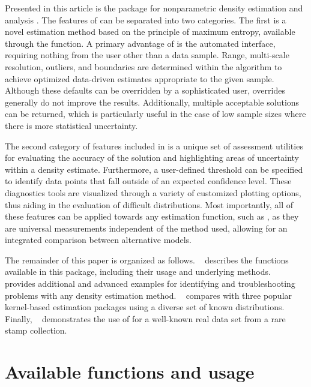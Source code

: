Presented in this article is the package  for nonparametric density estimation and analysis \citep{PDFe1}. The features of  can be separated into two categories. The first is a novel estimation method based on the principle of maximum entropy, available through the  function. A primary advantage of  is the automated interface, requiring nothing from the user other than a data sample. Range, multi-scale resolution, outliers, and boundaries are determined within the algorithm to achieve optimized data-driven estimates appropriate to the given sample. Although these defaults can be overridden by a sophisticated user, overrides generally do not improve the results. Additionally, multiple acceptable solutions can be returned, which is particularly useful in the case of low sample sizes where there is more statistical uncertainty.

The second category of features included in  is a unique set of assessment utilities for evaluating the accuracy of the solution and highlighting areas of uncertainty within a density estimate. Furthermore, a user-defined threshold can be specified to identify data points that fall outside of an expected confidence level. These diagnostics tools are visualized through a variety of customized plotting options, thus aiding in the evaluation of difficult distributions. Most importantly, all of these features can be applied towards any estimation function, such as , as they are universal measurements independent of the method used, allowing for an integrated comparison between alternative models.

The remainder of this paper is organized as follows. ~ describes the functions available in this package, including their usage and underlying methods. ~ provides additional and advanced examples for identifying and troubleshooting problems with any density estimation method. ~ compares  with three popular kernel-based estimation packages using a diverse set of known distributions. Finally, ~ demonstrates the use of  for a well-known real data set from a rare stamp collection.  

\section{Available functions and usage} \label{sec:usage}

